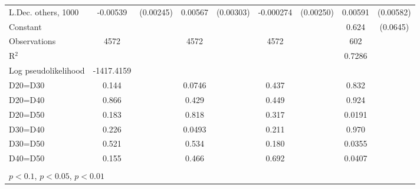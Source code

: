 \begin{tabular}{l|cccccc|cc}
L.Dec. others, 1000& -0.00539\sym{**} &(0.00245)&  0.00567\sym{*}  &(0.00303)&-0.000274         &(0.00250)&  0.00591         &(0.00582)\\
Constant        &                  &         &                  &         &                  &         &    0.624\sym{***}& (0.0645)\\
\hline
Observations    &     4572         &         &     4572         &         &     4572         &         &      602         &         \\
R$^2$      &                  &         &                  &         &                  &         &      0.7286     &   \\ 
Log pseudolikelihood  & -1417.4159   &         &                  &         &                  &         &           &   \\ 
D20=D30         &    0.144         &         &   0.0746         &         &    0.437         &         &    0.832         &         \\
D20=D40         &    0.866         &         &    0.429         &         &    0.449         &         &    0.924         &         \\
D20=D50         &    0.183         &         &    0.818         &         &    0.317         &         &   0.0191         &         \\
D30=D40         &    0.226         &         &   0.0493         &         &    0.211         &         &    0.970         &         \\
D30=D50         &    0.521         &         &    0.534         &         &    0.180         &         &   0.0355         &         \\
D40=D50         &    0.155         &         &    0.466         &         &    0.692         &         &   0.0407         &         \\
\hline\hline
\multicolumn{9}{p{16cm}}{\tiny }\\
\multicolumn{9}{l}{\tiny \sym{*} \(p<0.1\), \sym{**} \(p<0.05\), \sym{***} \(p<0.01\)}\\
\end{tabular}